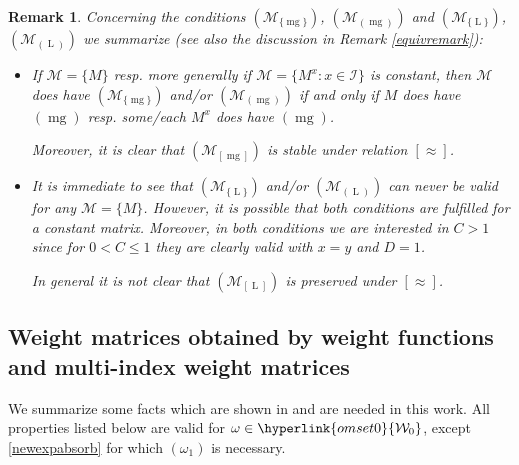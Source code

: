 \documentclass[10pt]{amsart}%
\numberwithin{equation}{section}
\theoremstyle{plain}
\newtheorem{remark}[proposition]{Remark}
\let\on=\operatorname
\begin{document}
\begin{remark}\label{mixedmgandLremark}
Concerning the conditions \hyperlink{R-mg}{$(\mathcal{M}_{\{\on{mg}\}})$}, \hyperlink{B-mg}{$(\mathcal{M}_{(\on{mg})})$} and \hyperlink{R-L}{$(\mathcal{M}_{\{\on{L}\}})$}, \hyperlink{B-L}{$(\mathcal{M}_{(\on{L})})$} we summarize (see also the discussion in Remark \ref{equivremark}):

\begin{itemize}
\item[$(i)$] If $\mathcal{M}=\{M\}$ resp. more generally if $\mathcal{M}=\{M^x: x\in\mathcal{I}\}$ is constant, then $\mathcal{M}$ does have \hyperlink{R-mg}{$(\mathcal{M}_{\{\on{mg}\}})$} and/or \hyperlink{B-mg}{$(\mathcal{M}_{(\on{mg})})$} if and only if $M$ does have \hyperlink{mg}{$(\on{mg})$} resp. some/each $M^x$ does have \hyperlink{mg}{$(\on{mg})$}.

    Moreover, it is clear that $(\mathcal{M}_{[\on{mg}]})$ is stable under relation $[\approx]$.

\item[$(ii)$] It is immediate to see that \hyperlink{R-L}{$(\mathcal{M}_{\{\on{L}\}})$} and/or \hyperlink{B-L}{$(\mathcal{M}_{(\on{L})})$} can never be valid for any $\mathcal{M}=\{M\}$. However, it is possible that both conditions are fulfilled for a constant matrix. Moreover, in both conditions we are interested in $C>1$ since for $0<C\le 1$ they are clearly valid with $x=y$ and $D=1$.

    In general it is not clear that $(\mathcal{M}_{[\on{L}]})$ is preserved under $[\approx]$.
\end{itemize}
\end{remark}

\subsection{Weight matrices obtained by weight functions and multi-index weight matrices}\label{weightmatrixfromfunction}
We summarize some facts which are shown in \cite[Section 5]{compositionpaper} and are needed in this work. All properties listed below are valid for $\omega\in\hyperlink{omset0}{\mathcal{W}_0}$, except \eqref{newexpabsorb} for which \hyperlink{om1}{$(\omega_1)$} is necessary.
\end{document}
